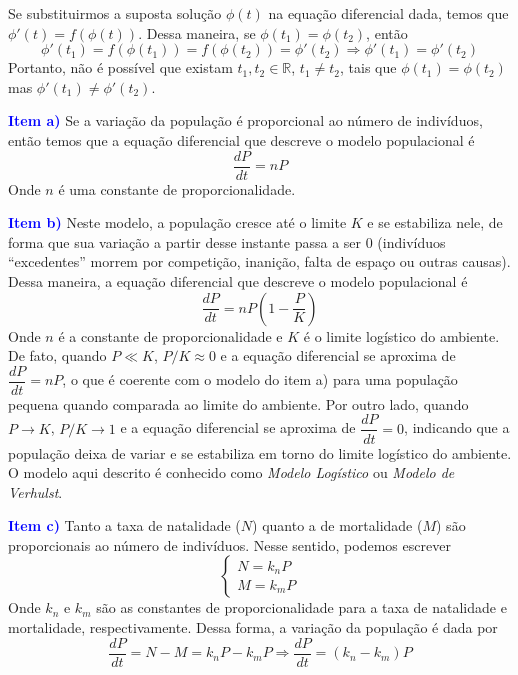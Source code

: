 \documentclass[oneside,12pt,a4paper]{report}
\begin{document}
        \begin{tcolorbox}[enhanced, breakable, colback=blue!1!white,colframe=blue!75!black,title=\textbf{\hyperlink{quest:ex10}{\hypertarget{resp:ex10}{Exercício 10}}}]
        \noindent Se substituirmos a suposta solução $\phi(t)$ na equação diferencial dada, temos que $\phi'(t) = f(\phi(t))$. Dessa maneira, se $\phi(t_1) = \phi(t_2)$, então 
        \[\phi'(t_1)=f(\phi(t_1)) = f(\phi(t_2))=\phi'(t_2)\Rightarrow\boxed{\phi'(t_1)=\phi'(t_2)}\]
        \noindent Portanto, não é possível que existam $t_1, t_2 \in \mathbb{R}$, $t_1\neq t_2$, tais que $\phi(t_1) = \phi(t_2)$ mas $\phi'(t_1) \neq \phi'(t_2)$.
        \end{tcolorbox}

        \begin{tcolorbox}[enhanced, breakable, colback=blue!1!white,colframe=blue!75!black,title=\textbf{\hyperlink{quest:ex11}{\hypertarget{resp:ex11}{Exercício 11}}}]
        \noindent\textcolor{blue}{\textbf{Item a)}} Se a variação da população é proporcional ao número de indivíduos, então temos que a equação diferencial que descreve o modelo populacional é
        \[\frac{dP}{dt} = nP\]
        \noindent Onde $n$ é uma constante de proporcionalidade.

        \noindent\textcolor{blue}{\textbf{Item b)}} Neste modelo, a população cresce até o limite $K$ e se estabiliza nele, de forma que sua variação a partir desse instante passa a ser $0$ (indivíduos ``excedentes'' morrem por competição, inanição, falta de espaço ou outras causas). Dessa maneira, a equação diferencial que descreve o modelo populacional é
        \[\frac{dP}{dt} = nP\left(1-\frac{P}{K}\right)\]
        \noindent Onde $n$ é a constante de proporcionalidade e $K$ é o limite logístico do ambiente. De fato, quando $P\ll K$, $P/K\approx 0$ e a equação diferencial se aproxima de $\dfrac{dP}{dt} = nP$, o que é coerente com o modelo do item a) para uma população pequena quando comparada ao limite do ambiente. Por outro lado, quando $P\rightarrow K$, $P/K \rightarrow 1$ e a equação diferencial se aproxima de $\dfrac{dP}{dt} = 0$, indicando que a população deixa de variar e se estabiliza em torno do limite logístico do ambiente. O modelo aqui descrito é conhecido como \textit{Modelo Logístico} ou \textit{Modelo de Verhulst}.

        \noindent\textcolor{blue}{\textbf{Item c)}} Tanto a taxa de natalidade ($N$) quanto a de mortalidade ($M$) são proporcionais ao número de indivíduos. Nesse sentido, podemos escrever
        \[\begin{cases}
            N = k_nP\\
            M = k_mP
        \end{cases}\]
        Onde $k_n$ e $k_m$ são as constantes de proporcionalidade para a taxa de natalidade e mortalidade, respectivamente. Dessa forma, a variação da população é dada por
        \[\frac{dP}{dt} = N - M = k_nP - k_mP \Rightarrow \boxed{\frac{dP}{dt}=(k_n-k_m)P}\]
        \end{tcolorbox}
\end{document}
